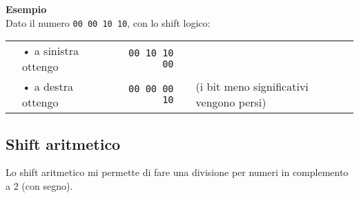 \documentclass[../main.tex]{subfiles}
\begin{document}
\begin{table}[h!]
\begin{minipage}{.45\linewidth}
        \vspace*{3mm}

        \centering

    \end{minipage}
\end{table}

\noindent
\textbf{Esempio} \\
Dato il numero \texttt{00 00 10 10}, con lo shift logico: \\
\hspace*{-2.2mm}
\begin{tabular}{ c l p{2mm} r c l }
    & • \hspace{-.5mm} a sinistra ottengo & & \texttt{00 10 10 00} \\
    & • \hspace{-.5mm} a destra ottengo & & \texttt{00 00 00 10} & & (i bit meno significativi vengono persi) \\
\end{tabular}

\subsection{Shift aritmetico}
Lo shift aritmetico mi permette di fare una divisione per numeri in
complemento a 2 (con segno).

\begin{table}[h!]
    \centering

    \hspace*{-6.48mm}
\end{table}
\end{document}
